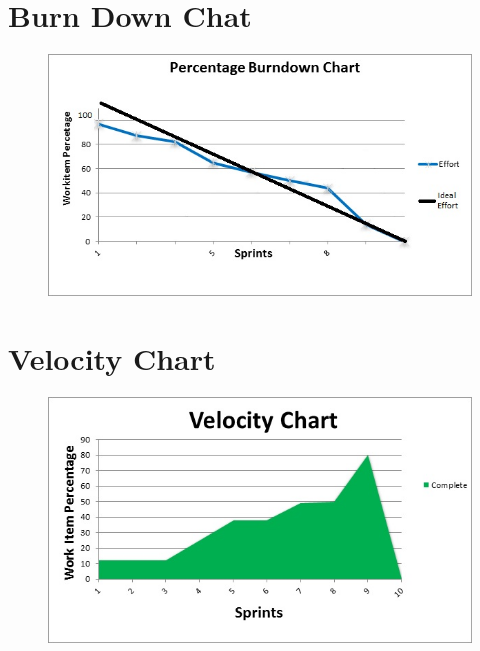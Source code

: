 \documentclass[a4paper]{article}
\begin{document}
\newpage
\section{Burn Down Chat}

\begin{center}
\begin{figure}
\includegraphics[width=1\linewidth]{./pictures/BurndownChart.jpg}
\end{figure}
\end{center}

\pagebreak
\section{Velocity Chart}

\begin{center}
\begin{figure}
\includegraphics[width=1\linewidth]{./pictures/VelocityChart.jpg}
\end{figure}
\end{center}
\end{document}
